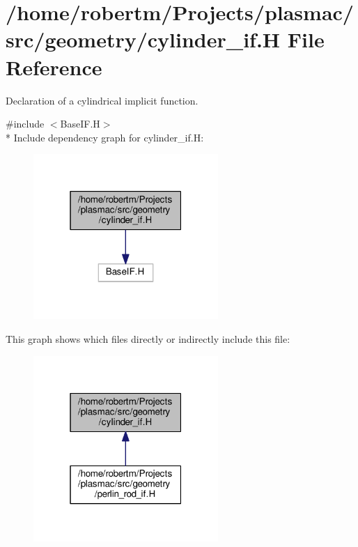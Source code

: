 \hypertarget{cylinder__if_8H}{}\section{/home/robertm/\+Projects/plasmac/src/geometry/cylinder\+\_\+if.H File Reference}
\label{cylinder__if_8H}


Declaration of a cylindrical implicit function.  


{\ttfamily \#include $<$Base\+I\+F.\+H$>$}\\*
Include dependency graph for cylinder\+\_\+if.\+H\+:\nopagebreak
\begin{figure}[H]
\begin{center}
\leavevmode
\includegraphics[width=199pt]{cylinder__if_8H__incl}
\end{center}
\end{figure}
This graph shows which files directly or indirectly include this file\+:\nopagebreak
\begin{figure}[H]
\begin{center}
\leavevmode
\includegraphics[width=199pt]{cylinder__if_8H__dep__incl}
\end{center}
\end{figure}
